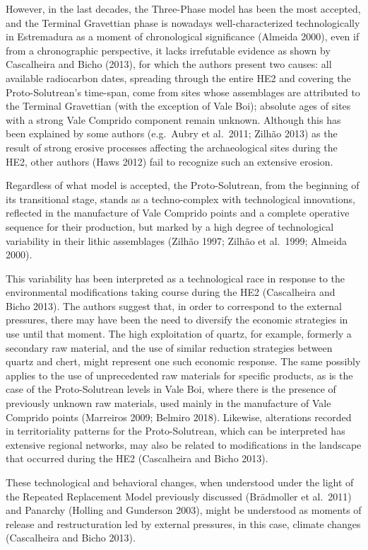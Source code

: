 \documentclass[12pt,twoside]{reedthesis}
\begin{document}
However, in the last decades, the Three-Phase model has been the most accepted, and the Terminal Gravettian phase is nowadays well-characterized technologically in Estremadura as a moment of chronological significance (Almeida 2000), even if from a chronographic perspective, it lacks irrefutable evidence as shown by Cascalheira and Bicho (2013), for which the authors present two causes: all available radiocarbon dates, spreading through the entire HE2 and covering the Proto-Solutrean's time-span, come from sites whose assemblages are attributed to the Terminal Gravettian (with the exception of Vale Boi); absolute ages of sites with a strong Vale Comprido component remain unknown.
Although this has been explained by some authors (e.g.~Aubry et al.~2011; Zilhão 2013) as the result of strong erosive processes affecting the archaeological sites during the HE2, other authors (Haws 2012) fail to recognize such an extensive erosion.

Regardless of what model is accepted, the Proto-Solutrean, from the beginning of its transitional stage, stands as a techno-complex with technological innovations, reflected in the manufacture of Vale Comprido points and a complete operative sequence for their production, but marked by a high degree of technological variability in their lithic assemblages (Zilhão 1997; Zilhão et al.~1999; Almeida 2000).

This variability has been interpreted as a technological race in response to the environmental modifications taking course during the HE2 (Cascalheira and Bicho 2013). The authors suggest that, in order to correspond to the external pressures, there may have been the need to diversify the economic strategies in use until that moment. The high exploitation of quartz, for example, formerly a secondary raw material, and the use of similar reduction strategies between quartz and chert, might represent one such economic response. The same possibly applies to the use of unprecedented raw materials for specific products, as is the case of the Proto-Solutrean levels in Vale Boi, where there is the presence of previously unknown raw materials, used mainly in the manufacture of Vale Comprido points (Marreiros 2009; Belmiro 2018). Likewise, alterations recorded in territoriality patterns for the Proto-Solutrean, which can be interpreted has extensive regional networks, may also be related to modifications in the landscape that occurred during the HE2 (Cascalheira and Bicho 2013).

These technological and behavioral changes, when understood under the light of the Repeated Replacement Model previously discussed (Brädmoller et al.~2011) and Panarchy (Holling and Gunderson 2003), might be understood as moments of release and restructuration led by external pressures, in this case, climate changes (Cascalheira and Bicho 2013).
\end{document}
